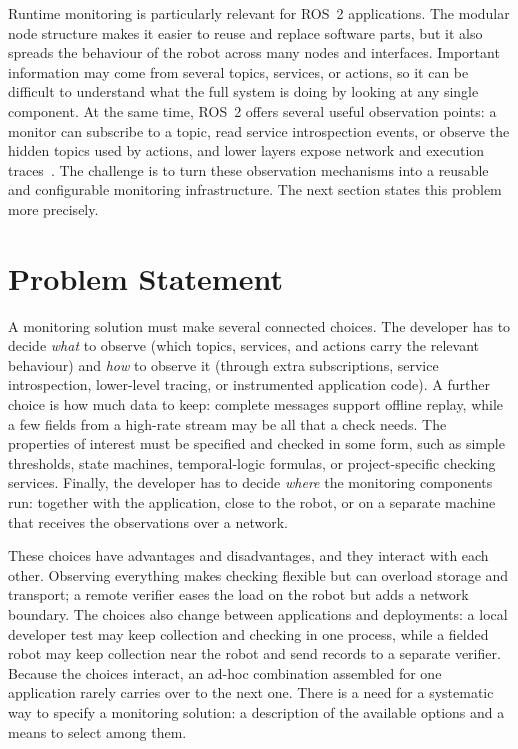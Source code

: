 Runtime monitoring is particularly relevant for ROS~2 applications. The
modular node structure makes it easier to reuse and replace software parts,
but it also spreads the behaviour of the robot across many nodes and
interfaces. Important information may come from several topics, services, or
actions, so it can be difficult to understand what the full system is doing by
looking at any single component. At the same time, ROS~2 offers several useful
observation points: a monitor can subscribe to a topic, read service
introspection events, or observe the hidden topics used by actions, and lower
layers expose network and execution traces~\cite{macenski2022ros2}. The
challenge is to turn these observation mechanisms into a reusable and
configurable monitoring infrastructure. The next section states this problem
more precisely.

\section{Problem Statement}\label{sec:problem}

A monitoring solution must make several connected choices. The developer has
to decide \emph{what} to observe (which topics, services, and actions carry
the relevant behaviour) and \emph{how} to observe it (through extra
subscriptions, service introspection, lower-level tracing, or instrumented
application code). A further choice is how much data to keep: complete
messages support offline replay, while a few fields from a high-rate stream
may be all that a check needs. The properties of interest must be specified
and checked in some form, such as simple thresholds, state machines,
temporal-logic formulas, or project-specific checking services. Finally, the
developer has to decide \emph{where} the monitoring components run: together
with the application, close to the robot, or on a separate machine that
receives the observations over a network.

These choices have advantages and disadvantages, and they interact with each
other. Observing everything makes checking flexible but can overload storage
and transport; a remote verifier eases the load on the robot but adds a
network boundary. The choices also change between applications and
deployments: a local developer test may keep collection and checking in one
process, while a fielded robot may keep collection near the robot and send
records to a separate verifier. Because the choices interact, an
ad-hoc combination assembled for one application rarely carries over to the
next one. There is a need for a systematic way to specify a monitoring
solution: a description of the available options and a means to select among
them.

